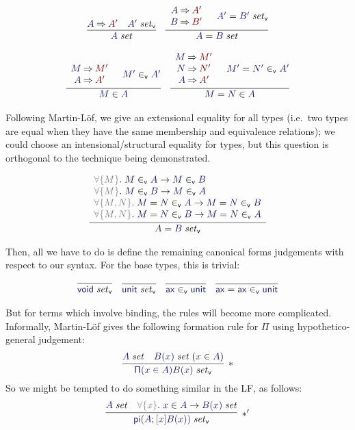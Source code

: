 \documentclass[acmtoplas]{acmtrans2m}
\def\InputModeColorName{MidnightBlue}
\def\OutputModeColorName{Maroon}
\newcommand\InputMode[1]{{\color{\InputModeColorName}{#1}}}
\newcommand\OutputMode[1]{{\color{\OutputModeColorName}{#1}}}
\newcommand\tyvoid{\mathsf{void}}
\newcommand\tyunit{\mathsf{unit}}
\newcommand\ax{\mathsf{ax}}
\newcommand\eval[2]{\InputMode{#1}\mathbin{\Rightarrow}\OutputMode{#2}}
\newcommand\isset[1]{\InputMode{#1}\;\mathit{set}}
\newcommand\eqset[2]{\InputMode{#1}=\InputMode{#2}\;\mathit{set}}
\newcommand\mem[2]{\InputMode{#1}\in\InputMode{#2}}
\newcommand\eqmem[3]{\InputMode{#1}=\InputMode{#2}\in\InputMode{#3}}
\newcommand\canset[1]{\InputMode{#1}\;\mathit{set}_\mathsf{v}}
\newcommand\eqcanset[2]{\InputMode{#1}=\InputMode{#2}\;\mathit{set}_\mathsf{v}}
\newcommand\canmem[2]{\InputMode{#1}\in_\mathsf{v}\InputMode{#2}}
\newcommand\eqcanmem[3]{\InputMode{#1}=\InputMode{#2}\in_\mathsf{v}\InputMode{#3}}
\newcommand\lfpi[2]{{\color{Gray}\forall\{#1\}}.\;#2}
\DeclareMathOperator{\typi}{\mathsf{pi}}
\begin{document}
\begin{gather*}
  \infer{
    \isset{A}
  }{
    \eval{A}{A'} &
    \canset{A'}
  }\quad
  \infer{
    \eqset{A}{B}
  }{
    \begin{array}{c}
      \eval{A}{A'} \\
      \eval{B}{B'}
    \end{array} &
      \eqcanset{A'}{B'}
  }\\[6pt]
  \infer{
    \mem{M}{A}
  }{
    \begin{array}{c}
      \eval{M}{M'}\\
      \eval{A}{A'}
    \end{array} &
    \canmem{M'}{A'}
  }\quad
  \infer{
    \eqmem{M}{N}{A}
  }{
    \begin{array}{c}
      \eval{M}{M'} \\
      \eval{N}{N'} \\
      \eval{A}{A'}
    \end{array} &
    \eqcanmem{M'}{N'}{A'}
  }
\end{gather*}

Following Martin-L\"of, we give an extensional equality for all types (i.e.\
two types are equal when they have the same membership and equivalence
relations); we could choose an intensional/structural equality for types, but
this question is orthogonal to the technique being demonstrated.

\begin{gather*}
  \infer{
    \eqcanset{A}{B}
  }{
    \begin{array}{l}
      \lfpi{M}{\canmem{M}{A}\to\canmem{M}{B}}\\
      \lfpi{M}{\canmem{M}{B}\to\canmem{M}{A}}\\
      \lfpi{M,N}{\eqcanmem{M}{N}{A}\to\eqcanmem{M}{N}{B}}\\
      \lfpi{M,N}{\eqcanmem{M}{N}{B}\to\eqcanmem{M}{N}{A}}
    \end{array}
  }
\end{gather*}

Then, all we have to do is define the remaining canonical forms judgements with
respect to our syntax. For the base types, this is trivial:

\begin{gather*}
  \infer{
    \canset\tyvoid
  }{
  }\quad
  \infer{
    \canset\tyunit
  }{
  }\quad
  \infer{
    \canmem\ax\tyunit
  }{
  }\quad
  \infer{
    \eqcanmem\ax\ax\tyunit
  }{
  }
\end{gather*}

But for terms which involve binding, the rules will become more complicated.
Informally, Martin-L\"of gives the following formation rule for $\mathsf\Pi$
using hypothetico-general judgement:
\[
  \infer[*]{
    \canset{\mathsf{\Pi}(x\in A)B(x)}
  }{
    \isset{A} &
    \isset{B(x)}\;(\mem{x}{A})
  }
\]
So we might be tempted to do something similar in the LF, as follows:
\[
  \infer[*']{
    \canset{\typi(A;[x]B(x))}
  }{
    \isset{A} &
    \lfpi{x}\mem{x}{A}\to\isset{B(x)}
  }
\]
\end{document}
